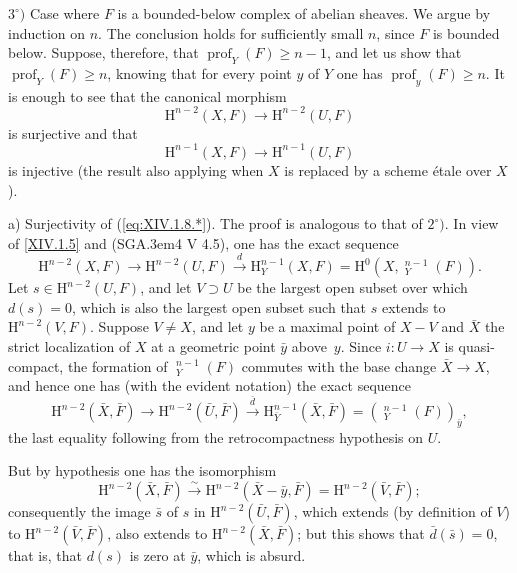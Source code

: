 \documentclass[11pt,a4paper,oneside]{book}
\providecommand{\pageoriginale}{%
  \refstepcounter{pageoriginal}%
  \marginpar{\raggedright\footnotesize\bfseries\thepageoriginal}%
  \xspace}
\providecommand{\SGA}{\textup{SGA}\kern.3em}
\providecommand{\h}{\mathop{\underline{H}}\nolimits}
\providecommand{\prof}{\operatorname{prof}}
\renewcommand{\H}{\mathrm H}
\providecommand{\lto}[1]{\xrightarrow{#1}}
\providecommand{\isomto}{\overset{\sim}{\longrightarrow}}
\theoremstyle{plain}
\theoremstyle{definition}
\theoremstyle{remark}
\renewcommand{\Ref}[1]{\textup{\ref{#1}}}
\begin{document}
$3^\circ)$ Case where $F$ is a bounded-below complex of abelian sheaves. We argue by induction on $n$. The conclusion holds for sufficiently small $n$, since $F$ is bounded below. Suppose, therefore, that $\prof_Y(F)\geq n-1$, and let us show that $\prof_Y(F)\geq n$, knowing that for every point $y$ of $Y$ one has $\prof_y(F)\geq n$. It is enough to see that the canonical morphism
\begin{equation*} \label{eq:XIV.1.8.*} \tag{$*$} {\H^{n-2}(X, F)\to \H^{n-2}(U, F)}
\end{equation*}
is surjective and that
\begin{equation*} \label{eq:XIV.1.8.**} \tag{$**$} {\H^{n-1}(X, F)\to \H^{n-1}(U, F)}
\end{equation*}
is injective (the result also applying when $X$ is replaced by a scheme étale over\pageoriginale $X$).

a) Surjectivity of (\Ref{eq:XIV.1.8.*}). The proof is analogous to that of $2^\circ)$. In view of \Ref{XIV.1.5} and (\SGA 4 V 4.5), one has the exact sequence
$$
\H^{n-2}(X, F)\to \H^{n-2}(U, F)\lto{d}\H^{n-1}_Y(X, F)=\H^0(X, {\h}_Y^{n-1}(F)).
$$
Let $s\in \H^{n-2}(U, F)$, and let $V\supset U$ be the largest open subset over which $d(s)=0$, which is also the largest open subset such that $s$ extends to $\H^{n-2}(V, F)$. Suppose $V\neq X$, and let $y$ be a maximal point of $X-V$ and $\bar X$ the strict localization of $X$ at a geometric point $\bar y$ above~$y$. Since $i:U\to X$ is quasi-compact, the formation of ${\h}_Y^{n-1}(F)$ commutes with the base change $\bar X\to X$, and hence one has (with the evident notation) the exact sequence
$$
\H^{n-2}(\bar X, \bar F)\to \H^{n-2}(\bar U, \bar F)\lto{\bar d}\H^{n-1}_{\bar Y}(\bar X, \bar F)=({\h}_Y^{n-1}(F))_{\bar y},
$$
the last equality following from the retrocompactness hypothesis on $U$.

But by hypothesis one has the isomorphism
$$
\H^{n-2}(\bar X, \bar F)\isomto \H^{n-2}(\bar X-\bar y, \bar F)=\H^{n-2}(\bar V, \bar F);
$$
consequently the image $\bar s$ of $s$ in $\H^{n-2}(\bar U, \bar F)$, which extends (by definition of $V$) to $\H^{n-2}(\bar V, \bar F)$, also extends to $\H^{n-2}(\bar X, \bar F)$; but this shows that $\bar d(\bar s)=0$, that is, that $d(s)$ is zero at $\bar y$, which is absurd.
\end{document}
